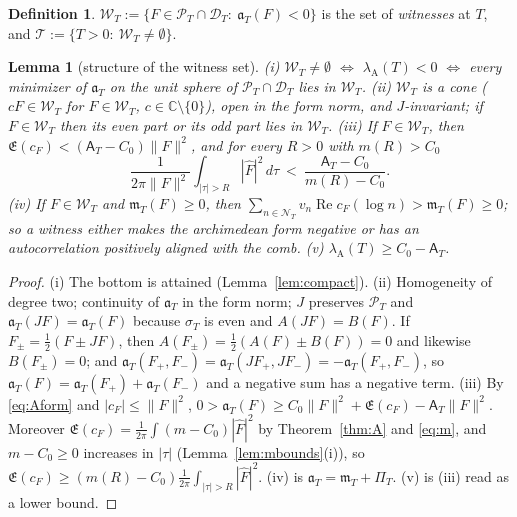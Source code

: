 \documentclass[11pt]{amsart}
\newtheorem{lemma}[theorem]{Lemma}
\theoremstyle{definition}
\newtheorem{definition}[theorem]{Definition}
\theoremstyle{remark}
\newcommand{\C}{\mathbb C}
\newcommand{\Rel}{\operatorname{Re}}
\newcommand{\PT}{\mathcal P_T}
\newcommand{\lamA}{\lambda_{\mathrm A}(T)}
\newcommand{\sT}{\sigma_T}
\newcommand{\Fh}{\widehat F}
\newcommand{\cF}{c_F}
\newcommand{\Lev}{\mathfrak E}
\newcommand{\NT}{\mathcal N_T}
\newcommand{\Aconst}{\mathsf A_T}
\newcommand{\PiT}{\Pi_T}
\newcommand{\mT}{\mathfrak m_T}
\begin{document}
\begin{definition}\label{def:wit}
$\mathscr W_T:=\{F\in\PT\cap\mathcal D_T:\ \mathfrak a_T(F)<0\}$ is the set of \emph{witnesses} at $T$, and
$\mathscr T:=\{T>0:\ \mathscr W_T\ne\emptyset\}$.
\end{definition}

\begin{lemma}[structure of the witness set]\label{lem:wit-basic}
\emph{(i)} $\mathscr W_T\ne\emptyset$ $\iff$ $\lamA<0$ $\iff$ every minimizer of $\mathfrak a_T$ on the unit sphere of
$\PT\cap\mathcal D_T$ lies in $\mathscr W_T$.
\emph{(ii)} $\mathscr W_T$ is a cone ($cF\in\mathscr W_T$ for $F\in\mathscr W_T$, $c\in\C\setminus\{0\}$), open in the form norm,
and $J$-invariant; if $F\in\mathscr W_T$ then its even part or its odd part lies in $\mathscr W_T$.
\emph{(iii)} If $F\in\mathscr W_T$, then $\Lev(\cF)<(\Aconst-C_0)\|F\|^2$, and for every $R>0$ with $m(R)>C_0$
\[
\frac1{2\pi\|F\|^2}\int_{|\tau|>R}|\Fh|^2\,d\tau\ <\ \frac{\Aconst-C_0}{m(R)-C_0}.
\]
\emph{(iv)} If $F\in\mathscr W_T$ and $\mT(F)\ge0$, then $\sum_{n\in\NT}v_n\Rel\cF(\log n)>\mT(F)\ge0$; so a witness either
makes the archimedean form negative or has an autocorrelation positively aligned with the comb.
\emph{(v)} $\lamA\ge C_0-\Aconst$.
\end{lemma}

\begin{proof}
(i) The bottom is attained (Lemma~\ref{lem:compact}). (ii) Homogeneity of degree two; continuity of $\mathfrak a_T$
in the form norm; $J$ preserves $\PT$ and $\mathfrak a_T(JF)=\mathfrak a_T(F)$ because $\sT$ is even and $A(JF)=B(F)$. If
$F_\pm=\frac12(F\pm JF)$, then $A(F_\pm)=\frac12(A(F)\pm B(F))=0$ and likewise $B(F_\pm)=0$; and
$\mathfrak a_T(F_+,F_-)=\mathfrak a_T(JF_+,JF_-)=-\mathfrak a_T(F_+,F_-)$, so $\mathfrak a_T(F)=\mathfrak a_T(F_+)+\mathfrak a_T(F_-)$ and a
negative sum has a negative term. (iii) By \eqref{eq:Aform} and $|\cF|\le\|F\|^2$,
$0>\mathfrak a_T(F)\ge C_0\|F\|^2+\Lev(\cF)-\Aconst\|F\|^2$. Moreover
$\Lev(\cF)=\frac1{2\pi}\int(m-C_0)|\Fh|^2$ by Theorem~\ref{thm:A} and \eqref{eq:m}, and $m-C_0\ge0$ increases in
$|\tau|$ (Lemma~\ref{lem:mbounds}(i)), so $\Lev(\cF)\ge(m(R)-C_0)\frac1{2\pi}\int_{|\tau|>R}|\Fh|^2$. (iv) is
$\mathfrak a_T=\mT+\PiT$. (v) is (iii) read as a lower bound.
\end{proof}
\end{document}
